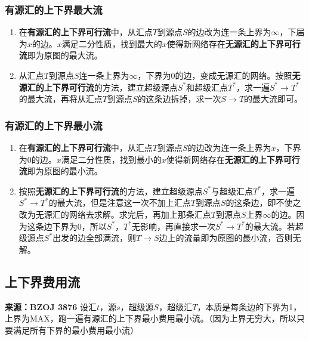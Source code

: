 \documentclass[landscape,twocolumn,a4paper]{article}
\begin{document}
	\subsubsection*{有源汇的上下界最大流}
	\begin{enumerate}
		\item 在\textbf{有源汇的上下界可行流}中，从汇点$T$到源点$S$的边改为连一条上界为$\infty$，下届为$x$的边。$x$满足二分性质，找到最大的$x$使得新网络存在\textbf{无源汇的上下界可行流}即为原图的最大流。
		\item 从汇点$T$到源点$S$连一条上界为$\infty$，下界为$0$的边，变成无源汇的网络。按照\textbf{无源汇的上下界可行流}的方法，建立超级源点$S^*$和超级汇点$T^*$，求一遍$S^* \rightarrow T^*$的最大流，再将从汇点$T$到源点$S$的这条边拆掉，求一次$S \rightarrow T$的最大流即可。
	\end{enumerate}
	
	\subsubsection*{有源汇的上下界最小流}
	\begin{enumerate}
		\item 在\textbf{有源汇的上下界可行流}中，从汇点$T$到源点$S$的边改为连一条上界为$x$，下界为$0$的边。$x$满足二分性质，找到最小的$x$使得新网络存在\textbf{无源汇的上下界可行流}即为原图的最小流。
		\item 按照\textbf{无源汇的上下界可行流}的方法，建立超级源点$S^*$与超级汇点$T^*$，求一遍$S^* \rightarrow T^*$的最大流，但是注意这一次不加上汇点$T$到源点$S$的这条边，即不使之改为无源汇的网络去求解。求完后，再加上那条汇点$T$到源点$S$上界$\infty$的边。因为这条边下界为$0$，所以$S^*$，$T^*$无影响，再直接求一次$S^* \rightarrow T^*$的最大流。若超级源点$S^*$出发的边全部满流，则$T \rightarrow S$边上的流量即为原图的最小流，否则无解。
	\end{enumerate}
	
	\subsection{上下界费用流}
	\noindent \textbf{来源：BZOJ 3876}
	\noindent 设汇$t$，源$s$，超级源$S$，超级汇$T$，本质是每条边的下界为1，上界为MAX，跑一遍有源汇的上下界最小费用最小流。（因为上界无穷大，所以只要满足所有下界的最小费用最小流）
	
\end{document}
